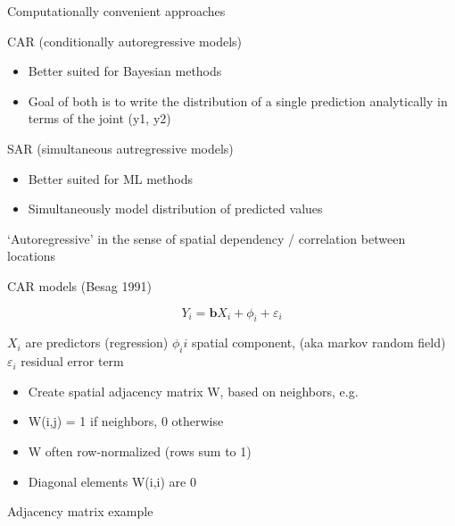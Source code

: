 \documentclass[
  ignorenonframetext,
]{beamer}
\providecommand{\tightlist}{%
  \setlength{\itemsep}{0pt}\setlength{\parskip}{0pt}}
\begin{document}
\begin{frame}{Computationally convenient approaches}
\protect\hypertarget{computationally-convenient-approaches}{}

CAR (conditionally autoregressive models)

\begin{itemize}
\tightlist
\item
  Better suited for Bayesian methods
\item
  Goal of both is to write the distribution of a single prediction
  analytically in terms of the joint (y1, y2)
\end{itemize}

SAR (simultaneous autregressive models)

\begin{itemize}
\tightlist
\item
  Better suited for ML methods
\item
  Simultaneously model distribution of predicted values
\end{itemize}

`Autoregressive' in the sense of spatial dependency / correlation
between locations

\end{frame}

\begin{frame}{CAR models (Besag 1991)}
\protect\hypertarget{car-models-besag-1991}{}

\[{ Y }_{ i }=\textbf{b}{ X }_{ i }+{ \phi  }_{ i }+{ \varepsilon  }_{ i }\]

\({ X }_{ i }\) are predictors (regression) \({ \phi }_{ i }i\) spatial
component, (aka markov random field) \({ \varepsilon }_{ i }\) residual
error term

\begin{itemize}
\tightlist
\item
  Create spatial adjacency matrix W, based on neighbors, e.g.~
\item
  W(i,j) = 1 if neighbors, 0 otherwise
\item
  W often row-normalized (rows sum to 1)
\item
  Diagonal elements W(i,i) are 0
\end{itemize}

\end{frame}

\begin{frame}{Adjacency matrix example}
\protect\hypertarget{adjacency-matrix-example}{}

\end{frame}
\end{document}
